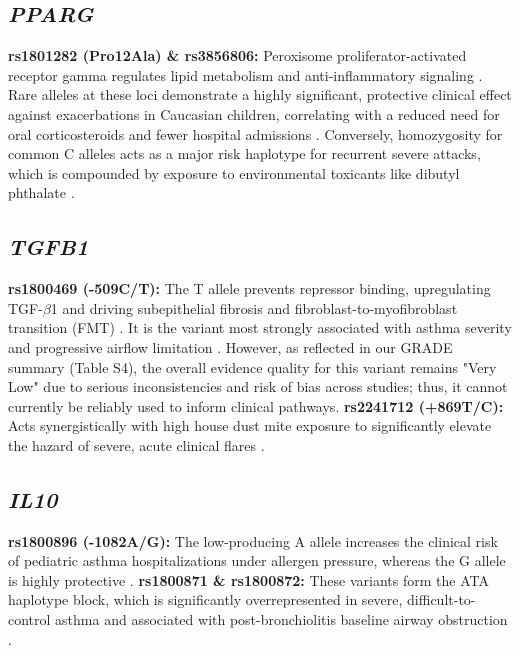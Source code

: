 \documentclass[11pt,a4paper]{article}
\begin{document}
\subsection{\textit{PPARG}}
\textbf{rs1801282 (Pro12Ala) \& rs3856806:} Peroxisome proliferator-activated receptor gamma regulates lipid metabolism and anti-inflammatory signaling \cite{KytikovaPerelman2020, BannoReddy2018}. Rare alleles at these loci demonstrate a highly significant, protective clinical effect against exacerbations in Caucasian children, correlating with a reduced need for oral corticosteroids and fewer hospital admissions \cite{WangTantisira2016, GarcaRicobarazaGarcaBermdez2020}. Conversely, homozygosity for common C alleles acts as a major risk haplotype for recurrent severe attacks, which is compounded by exposure to environmental toxicants like dibutyl phthalate \cite{LeungRyu2022}.

\subsection{\textit{TGFB1}}
\textbf{rs1800469 (-509C/T):} The T allele prevents repressor binding, upregulating TGF-$\beta$1 and driving subepithelial fibrosis and fibroblast-to-myofibroblast transition (FMT) \cite{PlichtaPanek2025, KowinJonakowski2024, KowinJonakowski2025}. It is the variant most strongly associated with asthma severity and progressive airflow limitation \cite{PanekStawiski2022, PanekKarbownik2022}. However, as reflected in our GRADE summary (Table S4), the overall evidence quality for this variant remains "Very Low" due to serious inconsistencies and risk of bias across studies; thus, it cannot currently be reliably used to inform clinical pathways.
\textbf{rs2241712 (+869T/C):} Acts synergistically with high house dust mite exposure to significantly elevate the hazard of severe, acute clinical flares \cite{ParkTantisira2017}.

\subsection{\textit{IL10}}
\textbf{rs1800896 (-1082A/G):} The low-producing A allele increases the clinical risk of pediatric asthma hospitalizations under allergen pressure, whereas the G allele is highly protective \cite{WangTantisira2016, HolsterNuolivirta2019, ZhouZhang2023}.
\textbf{rs1800871 \& rs1800872:} These variants form the ATA haplotype block, which is significantly overrepresented in severe, difficult-to-control asthma and associated with post-bronchiolitis baseline airway obstruction \cite{HolsterNuolivirta2019, LauhkonenKoponen2015, MocellinLeito2021, PavnRomeroPrezRubio2020}.
\end{document}
